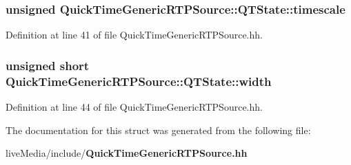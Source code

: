 \subsubsection[{timescale}]{\setlength{\rightskip}{0pt plus 5cm}unsigned Quick\+Time\+Generic\+R\+T\+P\+Source\+::\+Q\+T\+State\+::timescale}\label{structQuickTimeGenericRTPSource_1_1QTState_a5aa7fa9104579d8a4232a05e11285228}


Definition at line 41 of file Quick\+Time\+Generic\+R\+T\+P\+Source.\+hh.

\subsubsection[{width}]{\setlength{\rightskip}{0pt plus 5cm}unsigned short Quick\+Time\+Generic\+R\+T\+P\+Source\+::\+Q\+T\+State\+::width}\label{structQuickTimeGenericRTPSource_1_1QTState_a7b6beb622bfe16fd82b427e787fa0ba1}


Definition at line 44 of file Quick\+Time\+Generic\+R\+T\+P\+Source.\+hh.



The documentation for this struct was generated from the following file\+:\begin{DoxyCompactItemize}
\item 
live\+Media/include/{\bf Quick\+Time\+Generic\+R\+T\+P\+Source.\+hh}\end{DoxyCompactItemize}
